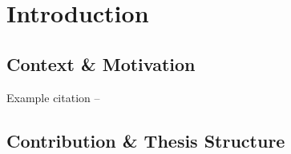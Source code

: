 \chapter{\label{intro}Introduction} 

\section{Context \& Motivation}
Example citation -- \cite{Yordanov2020}

\section{Contribution \& Thesis Structure}

